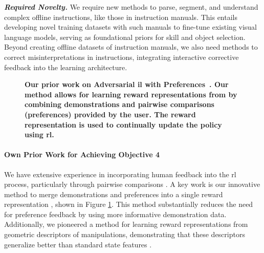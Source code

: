 \documentclass{erc-B2}
\begin{document}

\textit{\textbf{Required Novelty.}} We require new methods to parse, segment, and understand complex offline instructions, like those in instruction manuals. This entails developing novel training datasets with such manuals to fine-tune existing visual language models, serving as foundational priors for skill and object selection. Beyond creating offline datasets of instruction manuals, we also need methods to correct misinterpretations in instructions, integrating interactive corrective feedback into the learning architecture.

\begin{figure}
     \caption{\small \textbf{Our prior work on Adversarial \gls*{il} with Preferences~\cite{taranovic2023ailp}. Our method allows for learning reward representations from by combining demonstrations and pairwise comparisons (preferences) provided by the user. The reward representation is used to continually update the policy using \gls*{rl}. }} 

  \label{fig:AILP}
\end{figure}
\paragraph{Own Prior Work for Achieving Objective 4} We have extensive experience in incorporating human feedback into the \gls*{rl} process, particularly through pairwise comparisons \cite{wirth2016PrefRL, wirth2017PrefSurvey, pinsler2018PrefGrasp}. A key work is our innovative method to merge demonstrations and preferences into a single reward representation \cite{taranovic2023ailp}, shown in Figure \ref{fig:AILP}.
This method substantially reduces the need for preference feedback by using more informative demonstration data. Additionally, we pioneered a method for learning reward representations from geometric descriptors of manipulations, demonstrating that these descriptors generalize better than standard state features \cite{freymuth2022vigor}.
\end{document}
